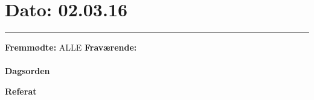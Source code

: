 

\section{Dato: 02.03.16}
\hrule

\textbf{Fremmødte:} ALLE
\textbf{Fraværende:} 
\\
\\
\textbf{Dagsorden}

\textbf{Referat} 
\\
